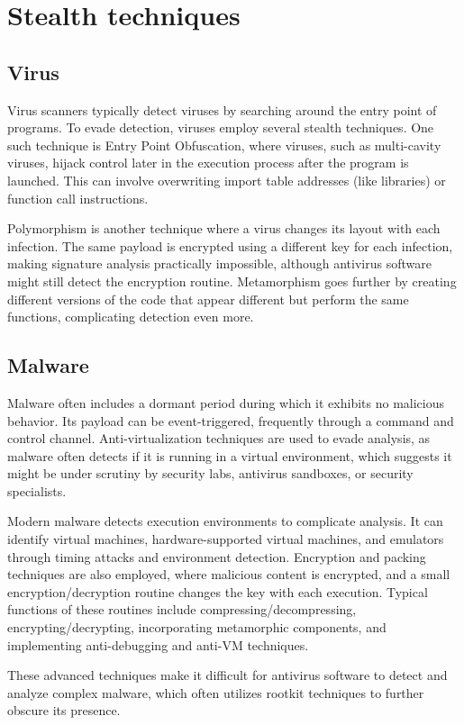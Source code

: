\section{Stealth techniques}

\subsection{Virus}
Virus scanners typically detect viruses by searching around the entry point of programs. 
To evade detection, viruses employ several stealth techniques. 
One such technique is Entry Point Obfuscation, where viruses, such as multi-cavity viruses, hijack control later in the execution process after the program is launched. 
This can involve overwriting import table addresses (like libraries) or function call instructions.

Polymorphism is another technique where a virus changes its layout with each infection. 
The same payload is encrypted using a different key for each infection, making signature analysis practically impossible, although antivirus software might still detect the encryption routine. 
Metamorphism goes further by creating different versions of the code that appear different but perform the same functions, complicating detection even more.

\subsection{Malware}
Malware often includes a dormant period during which it exhibits no malicious behavior. 
Its payload can be event-triggered, frequently through a command and control channel. 
Anti-virtualization techniques are used to evade analysis, as malware often detects if it is running in a virtual environment, which suggests it might be under scrutiny by security labs, antivirus sandboxes, or security specialists.

Modern malware detects execution environments to complicate analysis. 
It can identify virtual machines, hardware-supported virtual machines, and emulators through timing attacks and environment detection. 
Encryption and packing techniques are also employed, where malicious content is encrypted, and a small encryption/decryption routine changes the key with each execution. 
Typical functions of these routines include compressing/decompressing, encrypting/decrypting, incorporating metamorphic components, and implementing anti-debugging and anti-VM techniques.

These advanced techniques make it difficult for antivirus software to detect and analyze complex malware, which often utilizes rootkit techniques to further obscure its presence.

